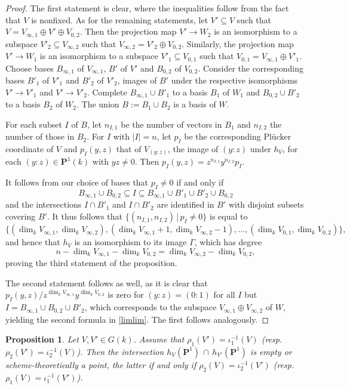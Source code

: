 \documentclass[a4paper,11pt]{amsart}
\theoremstyle{plain}
\newtheorem{prop}[thm]{Proposition}
\theoremstyle{definition}
\theoremstyle{remark}
\def\IP{{\mathbf P}}
\begin{document}
\begin{proof} The first statement is clear, where the inequalities follow from the fact that $V$ is nonfixed. As for the remaining statements, let $V'\subseteq V$ such that 
$V=V_{\infty,1}\oplus V'\oplus V_{0,2}$. Then the projection map $V'\to W_2$ is an isomorphism to a subspace $V'_2\subseteq V_{\infty,2}$ such that 
$V_{\infty,2}=V'_2\oplus V_{0,2}$. Similarly, the projection map $V'\to W_1$ is an isomorphism to a subspace $V'_1\subseteq V_{0,1}$ such that 
$V_{0,1}=V_{\infty,1}\oplus V'_1$. Choose bases $B_{\infty,1}$ of $V_{\infty,1}$, $B'$ of $V'$ and $B_{0,2}$ of $V_{0,2}$. Consider the corresponding bases 
$B'_1$ of $V'_1$ and $B'_2$ of $V'_2$, images of $B'$ under the respective isomorphisms $V'\to V'_1$ and $V'\to V'_2$. Complete $B_{\infty,1}\cup B'_1$ to a basis $B_1$ of 
$W_1$ and $B_{0,2}\cup B'_2$ to a basis $B_2$ of $W_2$. The union $B:=B_1\cup B_2$ is a basis of $W$.

For each subset $I$ of $B$, let $n_{I,1}$ be the number of vectors in $B_1$
and $n_{I,2}$ the number of those in $B_2$. For $I$ with $|I|=n$, let $p_I$ be the corresponding Pl\"ucker coordinate of
$V$ and $p_I(y,z)$ that of $V_{(y:z)}$, the image of $(y:z)$ under $h_V$, for each $(y:z)\in\IP^1(k)$ with $yz\neq 0$.
Then $p_I(y,z)=z^{n_{I,1}}y^{n_{I,2}}p_I$.

It follows from our choice of bases that $p_I\neq 0$ if and only if 
$$
B_{\infty,1}\cup B_{0,2}\subseteq I\subseteq B_{\infty,1}\cup B'_1\cup B'_2\cup B_{0,2}
$$
and the intersections $I\cap B'_1$ and $I\cap B'_2$ are identified in $B'$ with disjoint subsets covering $B'$. It thus follows that $\{(n_{I,1},n_{I,2})\,|\,p_I\neq 0\}$ is equal to
$$
\{(\dim_k V_{\infty,1},\dim_k V_{\infty,2}),(\dim_k V_{\infty,1}+1,\dim_k V_{\infty,2}-1),\dots,(\dim_k V_{0,1},\dim_k V_{0,2})\},
$$
and hence that $h_V$ is an isomorphism to its image $\Gamma$, which has degree
$$
n-\dim_k V_{\infty,1}-\dim_k V_{0,2}=\dim_k V_{\infty,2}-\dim_k V_{0,2},
$$ 
proving the third statement of the proposition.

The second statement follows as well, as it is clear that 
$p_I(y,z)/z^{\dim_k V_{\infty,1}}y^{\dim_k V_{0,2}}$ is zero for $(y:z)=(0:1)$ for all $I$ but $I=B_{\infty,1}\cup B_{0,2}\cup B'_2$, which corresponds to the subspace $V_{\infty,1}\oplus V_{\infty,2}$ of $W$, yielding the second formula in \eqref{limlim}. The first follows analogously.
\end{proof}

\begin{prop} \label{hVV} Let $V,V'\in G(k)$. Assume that $\rho_1(V')=\iota^{-1}_1(V)$ (resp.~$\rho_2(V')=\iota_2^{-1}(V)$). Then the intersection $h_{V}(\IP^1)\,\cap\,h_{V'}(\IP^1)$ is empty or scheme-theoretically a point, the latter if and only if $\rho_2(V)=\iota_2^{-1}(V')$ (resp.~$\rho_1(V)=\iota_1^{-1}(V')$).
\end{prop}
\end{document}
